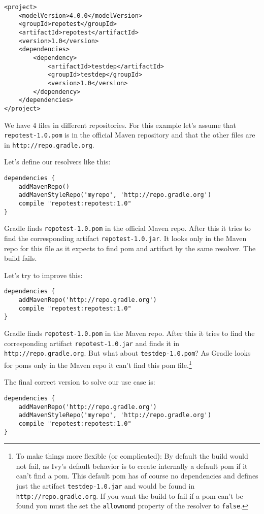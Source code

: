 \begin{Verbatim}
<project>
    <modelVersion>4.0.0</modelVersion>
    <groupId>repotest</groupId>
    <artifactId>repotest</artifactId>
    <version>1.0</version>
    <dependencies>
        <dependency>
            <artifactId>testdep</artifactId>
            <groupId>testdep</groupId>
            <version>1.0</version>
        </dependency>
    </dependencies>
</project>
\end{Verbatim}

We have 4 files in different repositories. For this example let's assume that \texttt{repotest-1.0.pom} is in the official Maven repository and that the other files are in \texttt{http://repo.gradle.org}.

Let's define our resolvers like this:
\begin{Verbatim}
dependencies {  
    addMavenRepo() 
	addMavenStyleRepo('myrepo', 'http://repo.gradle.org')
	compile "repotest:repotest:1.0"	
}
\end{Verbatim}
Gradle finds \texttt{repotest-1.0.pom} in the official Maven repo. After this it tries to find the corresponding artifact \texttt{repotest-1.0.jar}. It looks only in the Maven repo for this file as it expects to find pom and artifact by the same resolver. The build fails.

Let's try to improve this: 
\begin{Verbatim}
dependencies {  
    addMavenRepo('http://repo.gradle.org') 
	compile "repotest:repotest:1.0"	
}
\end{Verbatim}
Gradle finds \texttt{repotest-1.0.pom} in the Maven repo. After this it tries to find the corresponding artifact \texttt{repotest-1.0.jar} and finds it in \texttt{http://repo.gradle.org}. But what about \texttt{testdep-1.0.pom}? As Gradle looks for poms only in the Maven repo it can't find this pom file.\footnote{To make things more flexible (or complicated): By default the build would not fail, as Ivy's default behavior is to create internally a default pom if it can't find a pom. This default pom has of course no dependencies and defines just the artifact \texttt{testdep-1.0.jar} and would be found in \texttt{http://repo.gradle.org}. If you want the build to fail if a pom can't be found you must the set the \texttt{allownomd} property of the resolver to \texttt{false}.}

The final correct version to solve our use case is:
\begin{Verbatim}
dependencies {  
    addMavenRepo('http://repo.gradle.org') 
    addMavenStyleRepo('myrepo', 'http://repo.gradle.org') 
	compile "repotest:repotest:1.0"	
}
\end{Verbatim}

